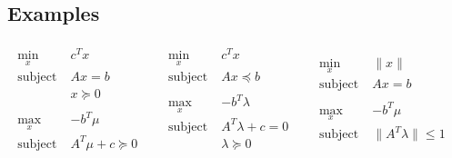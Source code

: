 \documentclass[a4paper, 11pt, twocolumn, landscape]{article}
\theoremstyle{lemma-style}
\theoremstyle{thm-style}
\theoremstyle{prop-style}
\theoremstyle{cor-style}
\newcommand{\norm}[1]{\|#1\|}
\begin{document}
\begin{small}
\subsection{Examples}

\begin{equation*}
\begin{array}{l|l|l}
    \begin{array}{lll}
      \underset{x}{\text{min}} & c^T x \\
      \text{subject to} & A x = b \\
                               &  x \succeq 0 \\
      & & \\
      \underset{x}{\text{max}} & - b^T \mu \\
      \text{subject to} & A^T \mu + c \succeq 0\\
    \end{array} &
    \begin{array}{lll}
      \underset{x}{\text{min}} & c^T x \\
      \text{subject to} & A x \preceq b \\
      & & \\
      \underset{x}{\text{max}} & - b^T \lambda \\
      \text{subject to} & A^T \lambda + c = 0\\
                               & \lambda \succeq 0\\
    \end{array} &
    \begin{array}{lll}
      \underset{x}{\text{min}} & \norm{x} \\
      \text{subject to} & A x = b \\
      & & \\
      \underset{x}{\text{max}} & - b^T \mu \\
      \text{subject to} & \norm{A^T \lambda} \le 1\\
    \end{array}
\end{array}
\end{equation*}


\end{small}
\end{document}
